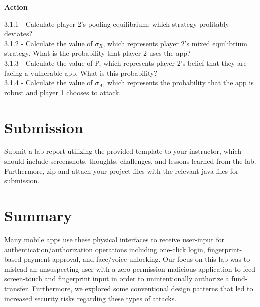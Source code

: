 \documentclass[letterpaper,12pt]{report}
\begin{document}
\begin{mdframed}[backgroundcolor=blue!10,style=code,nobreak=true,align=center,userdefinedwidth=14cm]

\textbf{Action}
\bigskip

3.1.1 - Calculate player 2's pooling equilibrium; which strategy profitably deviates?\\
3.1.2 - Calculate the value of $\sigma_R$, which represents player 2's mixed equilibrium strategy. What is the probability that player 2 uses the app?\\
3.1.3 - Calculate the value of P, which represents player 2's belief that they are facing a vulnerable app. What is this probability?\\
3.1.4 - Calculate the value of $\sigma_A$, which represents the probability that the app is robust and player 1 chooses to attack.\\
\end{mdframed}


\section*{Submission}\label{sec:Submission}

Submit a lab report utilizing the provided template to your instructor, which should include screenshots, thoughts, challenges, and lessons learned from the lab. Furthermore, zip and attach your project files with the relevant java files for submission.


\section*{Summary}\label{sec:Summary}

Many mobile apps use these physical interfaces to receive user-input for authentication/authorization operations including one-click login, fingerprint-based payment approval, and face/voice unlocking. Our focus on this lab was to mislead an unsuspecting user with a zero-permission malicious application to feed screen-touch and fingerprint input in order to unintentionally authorize a fund-transfer. Furthermore, we explored some conventional design patterns that led to increased security risks regarding these types of attacks.
\end{document}
